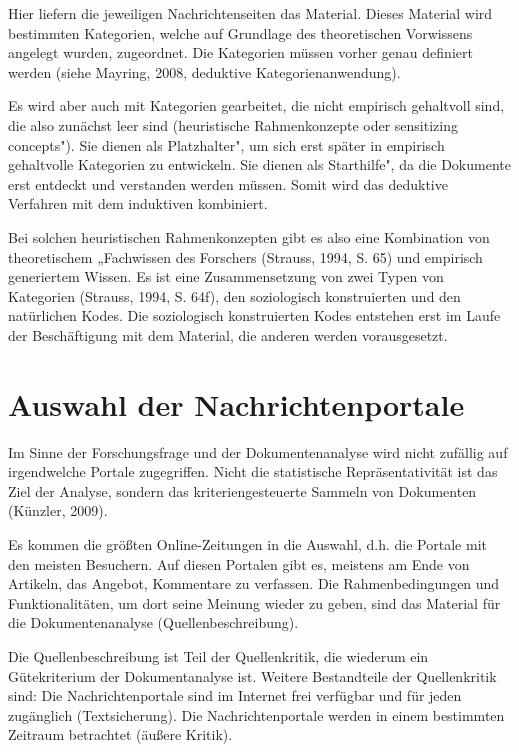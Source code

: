 Hier liefern die jeweiligen Nachrichtenseiten das Material. Dieses Material wird
bestimmten Kategorien, welche auf Grundlage des theoretischen Vorwissens angelegt
wurden, zugeordnet. Die Kategorien müssen vorher genau definiert werden (siehe
Mayring, 2008, deduktive Kategorienanwendung). 

Es wird aber auch mit Kategorien gearbeitet, die nicht empirisch gehaltvoll sind, die also
zunächst \glqq leer\grqq\- sind (\glqq heuristische Rahmenkonzepte\grqq\- oder \glqq sensitizing concepts"). 
Sie dienen als \glqq Platzhalter", um sich erst später in empirisch
gehaltvolle Kategorien zu entwickeln. Sie dienen als \glqq Starthilfe", da die Dokumente erst
entdeckt und verstanden werden müssen. Somit wird das deduktive Verfahren mit
dem induktiven kombiniert.  

Bei solchen heuristischen Rahmenkonzepten gibt es also eine Kombination von
theoretischem „Fachwissen des Forschers\grqq\- (Strauss, 1994, S. 65) und empirisch
generiertem Wissen. Es ist eine
Zusammensetzung von zwei Typen von Kategorien (Strauss, 1994, S. 64f), den
soziologisch konstruierten und den natürlichen Kodes. Die soziologisch
konstruierten Kodes entstehen erst im Laufe der Beschäftigung mit dem Material,
die anderen werden vorausgesetzt.




\section{Auswahl der Nachrichtenportale}

Im Sinne der Forschungsfrage und der Dokumentenanalyse wird nicht zufällig auf
irgendwelche Portale zugegriffen. Nicht die statistische Repräsentativität ist
das Ziel der Analyse, sondern das kriteriengesteuerte Sammeln von Dokumenten
(Künzler, 2009).  

Es kommen die \glqq größten\grqq\- Online-Zeitungen in die Auswahl, d.h. die Portale
mit den meisten Besuchern. Auf diesen Portalen gibt es, meistens am Ende von Artikeln, das Angebot, 
Kommentare zu verfassen. Die Rahmenbedingungen und Funktionalitäten, um dort seine Meinung wieder zu geben, 
sind das Material für die Dokumentenanalyse (Quellenbeschreibung). 

Die Quellenbeschreibung ist Teil der
Quellenkritik, die wiederum ein Gütekriterium der Dokumentanalyse ist. Weitere
Bestandteile der Quellenkritik sind: Die Nachrichtenportale sind im Internet
frei verfügbar und für jeden zugänglich (Textsicherung). Die Nachrichtenportale
werden in einem bestimmten Zeitraum betrachtet (äußere Kritik). 

